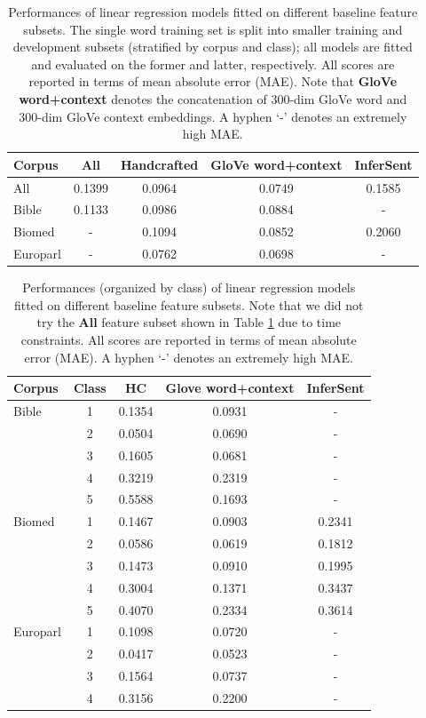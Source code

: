 \documentclass{dcthesis}
\theoremstyle{definition}
\theoremstyle{remark}
\begin{document}
\begin{table}
  \centering
  \begin{tabular}{l|c|c|c|c}
  \hline
  \textbf{Corpus} & \textbf{All} & \textbf{Handcrafted} & \textbf{GloVe word+context} & \textbf{InferSent} \\
  \hline
  All & 0.1399 & 0.0964 & 0.0749 & 0.1585 \\
  Bible & 0.1133 & 0.0986 & 0.0884 & - \\
  Biomed & - & 0.1094 & 0.0852 & 0.2060 \\
  Europarl & - & 0.0762 & 0.0698 & - \\
  \hline
  \end{tabular}
  \caption{\label{tab:baseline_models} Performances of linear regression models fitted on different baseline feature subsets. The single word training set is split into smaller training and development subsets (stratified by corpus and class); all models are fitted and evaluated on the former and latter, respectively. All scores are reported in terms of mean absolute error (MAE). Note that \textbf{GloVe word+context} denotes the concatenation of 300-dim GloVe word and 300-dim GloVe context embeddings. A hyphen `-' denotes an extremely high MAE.}
\end{table}

\begin{table}
  \centering
  \begin{tabular}{l|c|c|c|c}
  \hline
  \textbf{Corpus} & \textbf{Class} & \textbf{HC} & \textbf{Glove word+context} & \textbf{InferSent} \\
  \hline
  Bible & 1 & 0.1354 & 0.0931 & - \\
   & 2 & 0.0504 & 0.0690 & - \\
   & 3 & 0.1605 & 0.0681 & - \\
   & 4 & 0.3219 & 0.2319 & - \\
   & 5 & 0.5588 & 0.1693 & - \\
  \hline
  Biomed & 1 & 0.1467 & 0.0903 & 0.2341 \\
   & 2 & 0.0586 & 0.0619 & 0.1812 \\
   & 3 & 0.1473 & 0.0910 & 0.1995 \\
   & 4 & 0.3004 & 0.1371 & 0.3437 \\
   & 5 & 0.4070 & 0.2334 & 0.3614 \\
   \hline
  Europarl & 1 & 0.1098 & 0.0720 & - \\
   & 2 & 0.0417 & 0.0523 & - \\
   & 3 & 0.1564 & 0.0737 & - \\
   & 4 & 0.3156 & 0.2200 & - \\
  \hline
  \end{tabular}
  \caption{\label{tab:baseline_models_by_class} 
  Performances (organized by class) of linear regression models fitted on different baseline feature subsets. Note that we did not try the \textbf{All} feature subset shown in Table \ref{tab:baseline_models} due to time constraints. All scores are reported in terms of mean absolute error (MAE). A hyphen `-' denotes an extremely high MAE.}
\end{table}
\end{document}
